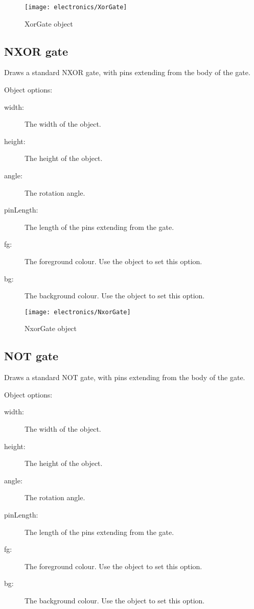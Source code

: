 \begin{figure}[h]
\centerline{\texttt{[image: electronics/XorGate]}}
\caption{XorGate object}
\label{fig:Xor_gate}
\end{figure}

\subsection{NXOR gate}
Draws a standard NXOR gate, with pins extending from the body of the gate.

Object options:
\begin{description}
\item[width:] The width of the object.
\item[height:] The height of the object.
\item[angle:] The rotation angle.
\item[pinLength:] The length of the pins extending from the gate.
\item[fg:] The foreground colour.  Use the  object to set this
option.
\item[bg:] The background colour.  Use the  object to set this
option.
\end{description}

\begin{figure}[h]
\centerline{\texttt{[image: electronics/NxorGate]}}
\caption{NxorGate object}
\label{fig:Nxor_gate}
\end{figure}

\subsection{NOT gate}
Draws a standard NOT gate, with pins extending from the body of the gate.

Object options:
\begin{description}
\item[width:] The width of the object.
\item[height:] The height of the object.
\item[angle:] The rotation angle.
\item[pinLength:] The length of the pins extending from the gate.
\item[fg:] The foreground colour.  Use the  object to set this
option.
\item[bg:] The background colour.  Use the  object to set this
option.
\end{description}

